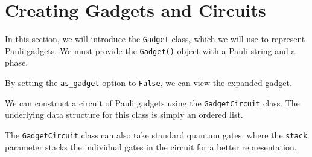 \section{Creating Gadgets and Circuits}

In this section, we will introduce the \lstinline{Gadget} class, which we will use to represent Pauli gadgets. We must provide the \lstinline{Gadget()} object with a Pauli string and a phase.


By setting the \lstinline{as_gadget} option to \lstinline{False}, we can view the expanded gadget.


We can construct a circuit of Pauli gadgets using the \lstinline{GadgetCircuit} class. The underlying data structure for this class is simply an ordered list.


The \lstinline{GadgetCircuit} class can also take standard quantum gates, where the \lstinline{stack} parameter stacks the individual gates in the circuit for a better representation.


